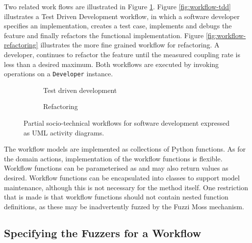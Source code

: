 \documentclass{sig-alternate}
\begin{document}
Two related work flows are illustrated in Figure \ref{fig:workflow-partial}.
Figure \ref{fig:workflow-tdd} illustrates a Test Driven Development workflow, in
which a software developer specifies an implementation, creates a test case,
implements and debugs the feature and finally refactors the functional
implementation.  Figure \ref{fig:workflow-refactoring} illustrates the more fine
grained workflow for refactoring.  A developer, continues to refactor the
feature until the measured coupling rate is less than a desired maximum.  Both
workflows are executed by invoking operations on a \lstinline!Developer!
instance.

\begin{figure}
  \centering

  \begin{subfigure}{\linewidth}


    \caption{Test driven development}
  \end{subfigure}

  \begin{subfigure}{\linewidth}
    
    \caption{Refactoring}
  \end{subfigure}
  
  \caption{Partial socio-technical workflows for software development expressed
    as UML activity diagrams.}

  \label{fig:workflow-partial}
\end{figure}


The workflow models are implemented as collections of Python functions.  As for
the domain actions, implementation of the workflow functions is
flexible. Workflow functions can be parameterised as and may also return values
as desired.  Workflow functions can be encapsulated into classes to support
model maintenance, although this is not necessary for the method itself.  One
restriction that is made is that workflow functions should not contain nested
function definitions, as these may be inadvertently fuzzed by the Fuzzi Moss
mechanism.


\subsection{Specifying the Fuzzers for a Workflow}

\end{document}
